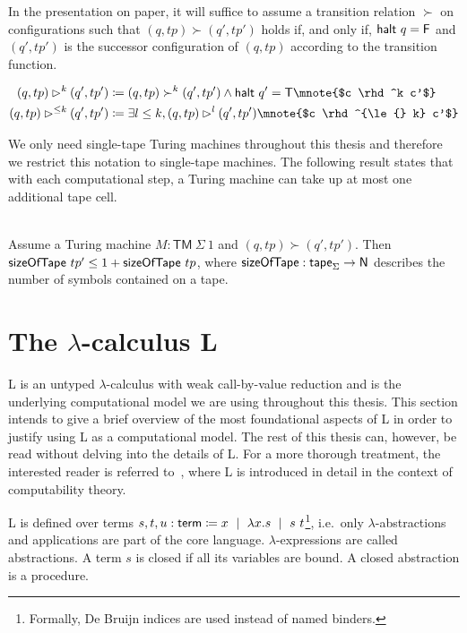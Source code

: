 In the presentation on paper, it will suffice to assume a transition relation $\succ$ on configurations such that 
$(q, tp) \succ (q', tp')$ holds if, and only if, $\textsf{halt}~q = \mathsf{F}$ and $(q', tp')$ is the successor configuration of $(q, tp)$ according to the transition function. 
\begin{definition}
  \begin{align*}
    (q, tp) \rhd^{k} (q', tp') &\defeq (q, tp) \succ^k (q', tp') \land \textsf{halt}~q' = \btrue \mnote{$c \rhd^k c'$}\\
    (q, tp) \rhd^{\le k} (q', tp') &\defeq \exists l \le k, (q, tp) \rhd^l (q', tp')\mnote{$c \rhd^{\le{} k} c'$}
  \end{align*}
\end{definition}

We only need single-tape Turing machines throughout this thesis and therefore we restrict this notation to single-tape machines.
The following result states that with each computational step, a Turing machine can take up at most one additional tape cell. 
\begin{lemma}\label{lem:time_bounds_space}~\\
  Assume a Turing machine $M : \textsf{TM}~\Sigma~1$ and $(q, tp) \succ (q', tp')$. Then $\textsf{sizeOfTape}~tp' \le 1 +{\textsf{sizeOfTape}~tp}$, 
  where $\textsf{sizeOfTape} : \textsf{tape}_\Sigma \rightarrow \mathsf{N}$ describes the number of symbols contained on a tape.
\end{lemma}

\newcommand{\Lterm}{\textsf{term}}
\section{The $\lambda$-calculus L}
L is an untyped $\lambda$-calculus with weak call-by-value reduction and is the underlying computational model we are using throughout this thesis. 
This section intends to give a brief overview of the most foundational aspects of L in order to justify using L as a computational model. The rest of this thesis can, however, be read without delving into the details of L. 
For a more thorough treatment, the interested reader is referred to~\cite{ForsterSmolka:2017:L-Computability}, where L is introduced in detail in the context of computability theory.

L is defined over terms\mnote{\Lterm} $s, t, u: \Lterm \defeq x \bnfmid \lambda x. s \bnfmid s~t$\footnote{Formally, De Bruijn indices are used instead of named binders.}, i.e.\ only $\lambda$-abstractions and applications are part of the core language. $\lambda$-expressions are called abstractions. A term $s$ is closed if all its variables are bound. A closed abstraction is a procedure.

